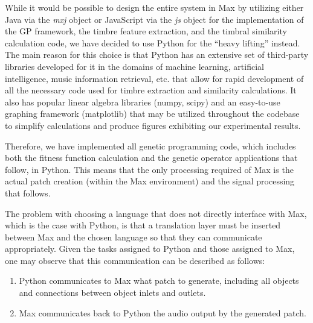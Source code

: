 \documentclass[12pt]{report} 	%
\numberwithin{figure}{chapter}
\numberwithin{table}{chapter}
\numberwithin{equation}{chapter}
\begin{document}
\begin{flushleft}
While it would be possible to design the entire system in Max by utilizing either Java via the \textit{mxj} object or JavaScript via the \textit{js} object for the implementation of the GP framework, the timbre feature extraction, and the timbral similarity calculation code, we have decided to use Python for the ``heavy lifting'' instead. The main reason for this choice is that Python has an extensive set of third-party libraries developed for it in the domains of machine learning, artificial intelligence, music information retrieval, etc. that allow for rapid development of all the necessary code used for timbre extraction and similarity calculations. It also has popular linear algebra libraries (numpy, scipy) and an easy-to-use graphing framework (matplotlib) that may be utilized throughout the codebase to simplify calculations and produce figures exhibiting our experimental results.

Therefore, we have implemented all genetic programming code, which includes both the fitness function calculation and the genetic operator applications that follow, in Python. This means that the only processing required of Max is the actual patch creation (within the Max environment) and the signal processing that follows.

The problem with choosing a language that does not directly interface with Max, which is the case with Python, is that a translation layer must be inserted between Max and the chosen language so that they can communicate appropriately. Given the tasks assigned to Python and those assigned to Max, one may observe that this communication can be described as follows:
\begin{enumerate}
\item Python communicates to Max what patch to generate, including all objects and connections between object inlets and outlets. 
\item Max communicates back to Python the audio output by the generated patch.
\end{enumerate}


\end{flushleft}
\end{document}
